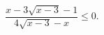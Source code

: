 \begin{ex}[type=inequality]
	\begin{condition}
		$\dfrac{x - 3\sqrt{x - 3} - 1}{4\sqrt{x - 3} - x}\leqslant 0.$
	\end{condition}
\end{ex}